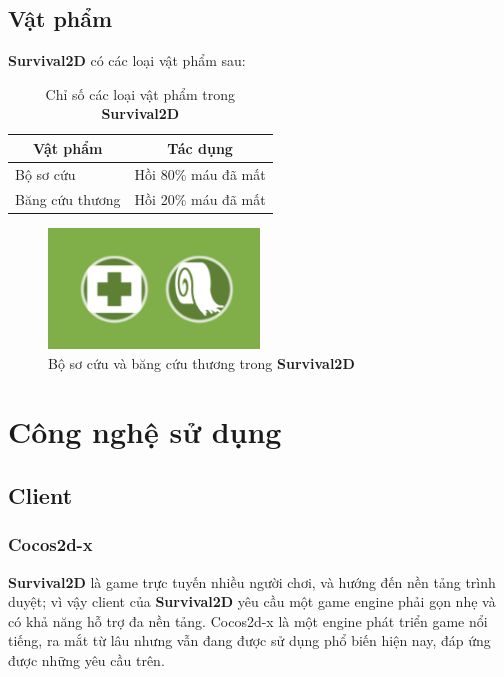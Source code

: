 \documentclass[12pt,a4paper]{article}
\begin{document}
  \subsection{Vật phẩm}
  \textbf{Survival2D} có các loại vật phẩm sau:
\begin{table}[H]
\centering
\begin{tabular}{|l|l|}
\hline
\multicolumn{1}{|c|}{\textbf{Vật phẩm}} & \multicolumn{1}{c|}{\textbf{Tác dụng}} \\ \hline
Bộ sơ cứu & Hồi 80\% máu đã mất \\ \hline
Băng cứu thương & Hồi 20\% máu đã mất \\ \hline
\end{tabular}
\caption{Chỉ số các loại vật phẩm trong \textbf{Survival2D}}
\end{table}
  \begin{figure}[H]
      \centering
      \includegraphics[width=0.5\textwidth]{Img/game_screen_shoot/items.png}
      \caption{Bộ sơ cứu và băng cứu thương trong \textbf{Survival2D}}
  \end{figure}
  
  \newpage
  \section{Công nghệ sử dụng}
  \subsection{Client}
  \subsubsection{Cocos2d-x}
  \textbf{Survival2D} là game trực tuyến nhiều người chơi, và hướng đến nền tảng trình duyệt; vì vậy client của \textbf{Survival2D} yêu cầu một game engine phải gọn nhẹ và có khả năng hỗ trợ đa nền tảng. Cocos2d-x là một engine phát triển game nổi tiếng, ra mắt từ lâu nhưng vẫn đang được sử dụng phổ biến hiện nay, đáp ứng được những yêu cầu trên.
  
\end{document}
